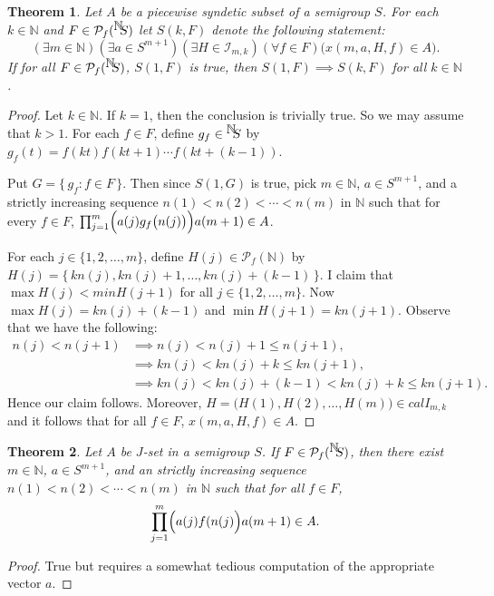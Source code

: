 \documentclass[12pt]{article}
\theoremstyle{plain}
\newtheorem*{thm}{Theorem}
\theoremstyle{definition}
\newcommand{\bbN}{\mathbb{N}}
\newcommand{\calI}{\mathcal{I}}
\newcommand{\Pf}{\mathcal{P}_f}
\newcommand{\setfunc}[2]{\hbox{${}^{\hbox{$#1$}}\hskip -3 pt #2$}}
\begin{document}
\begin{thm}
  Let $A$ be a piecewise syndetic subset of a semigroup $S$.
  For each $k \in \bbN$ and $F \in \Pf(\setfunc{\bbN}{S})$ let $S(k,
  F)$ denote the following statement:
  \[
    (\exists m \in \bbN) (\exists a \in S^{m+1}) (\exists H \in
    \calI_{m,k}) (\forall f \in F) \bigl( x(m, a, H, f) \in A \bigr).
  \]
  If for all $F \in \Pf(\setfunc{\bbN}{S})$, $S(1,F)$ is true,
  then $S(1, F) \implies S(k, F)$ for all $k \in \bbN$.
\end{thm}
\begin{proof}
  Let $k \in \bbN$.
  If $k = 1$, then the conclusion is trivially true.
  So we may assume that $k > 1$.
  For each $f \in F$, define $g_f \in \setfunc{\bbN}{S}$ by $g_f(t) =
  f(k t) f(k t+1) \cdots f(k t+(k-1))$. 
  
  Put $G = \{\, g_f : f \in F \,\}$.
  Then since $S(1, G)$ is true, pick $m \in \bbN$, $a \in S^{m+1}$,
  and a strictly increasing sequence $n(1) < n(2) < \cdots < n(m)$ in
  $\bbN$ such that for every $f \in F$,
  $\prod_{j=1}^m\Bigl(a(j)g_f \bigl(n(j)\bigr)\Bigr) a(m+1) \in A$. 

  For each $j \in \{1, 2, \ldots, m\}$, define $H(j) \in \Pf(\bbN)$ by
  $H(j) = \{\, k  n(j), k n(j) + 1, \ldots, k n(j) + (k-1) \,\}$. 
  I claim that $\max H(j) < min H(j+1)$ for all $j \in \{1, 2, \ldots,
  m\}$. 
  Now $\max H(j) = k n(j) + (k-1)$ and $\min H(j+1) = k n(j+1)$. 
  Observe that we have the following:
  \begin{align*}
    n(j) < n(j+1) &\implies n(j) < n(j) + 1 \le n(j+1), \\
    &\implies k n(j) < k n(j) + k \le k n(j+1), \\
    &\implies k n(j) < k n(j) + (k-1) < k n(j) + k \le k n(j+1).
  \end{align*}
  Hence our claim follows.
  Moreover, $H = \bigl(H(1), H(2), \ldots, H(m) \bigr) \in
  calI_{m,k}$ and it follows that for all $f \in F$, $x(m, a, H, f)
  \in A$.
\end{proof}

\begin{thm}
  Let $A$ be $J$-set in a semigroup $S$.
  If $F \in \Pf(\setfunc{\bbN}{S})$, then there exist $m \in \bbN$, $a
  \in S^{m+1}$, and an strictly increasing sequence $n(1) < n(2) <
  \cdots < n(m)$ in $\bbN$ such that for all $f \in F$, 
  \[
    \prod_{j=1}^m \Bigl( a(j) f(n(j) \Bigr)a(m+1) \in A.
  \]
\end{thm}
\begin{proof}
  True but requires a somewhat tedious computation of the appropriate 
  vector $a$. 
\end{proof}
\end{document}
